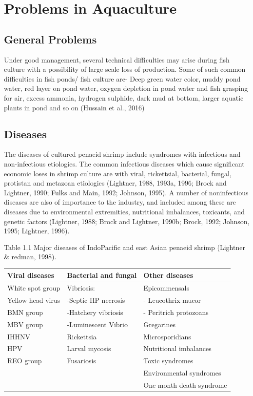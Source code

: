 \documentclass[
]{book}
\begin{document}
\hypertarget{problems-in-aquaculture}{%
\section{Problems in Aquaculture}\label{problems-in-aquaculture}}

\hypertarget{general-problems}{%
\subsection{General Problems}\label{general-problems}}

Under good management, several technical difficulties may arise during
fish culture with a possibility of large scale loss of production. Some
of such common difficulties in fish ponds/ fish culture are- Deep green
water color, muddy pond water, red layer on pond water, oxygen depletion
in pond water and fish grasping for air, excess ammonia, hydrogen
sulphide, dark mud at bottom, larger aquatic plants in pond and so on
(Hussain et al., 2016)

\hypertarget{diseases}{%
\subsection{Diseases}\label{diseases}}

The diseases of cultured penaeid shrimp include syndromes with
infectious and non-infectious etiologies. The common infectious diseases
which cause significant economic loses in shrimp culture are with viral,
rickettsial, bacterial, fungal, protistan and metazoan etiologies
(Lightner, 1988, 1993a, 1996; Brock and Lightner, 1990; Fulks and Main,
1992; Johnson, 1995). A number of noninfectious diseases are also of
importance to the industry, and included among these are diseases due to
environmental extremities, nutritional imbalances, toxicants, and
genetic factors (Lightner, 1988; Brock and Lightner, 1990b; Brock, 1992;
Johnson, 1995; Lightner, 1996).

Table 1.1 Major diseases of IndoPacific and east Asian penaeid shrimp
(Lightner \& redman, 1998).

\begin{longtable}[]{@{}lll@{}}
\toprule()
Viral diseases & Bacterial and fungal & Other diseases \\
\midrule()
\endhead
White spot group & Vibriosis: & Epicommensals \\
Yellow head virus & -Septic HP necrosis & - Leucothrix mucor \\
BMN group & -Hatchery vibriosis & - Peritrich protozoans \\
MBV group & -Luminescent Vibrio & Gregarines \\
IHHNV & Rickettsia & Microsporidians \\
HPV & Larval mycosis & Nutritional imbalances \\
REO group & Fusariosis & Toxic syndromes \\
& & Environmental syndromes \\
& & One month death syndrome \\
\bottomrule()
\end{longtable}
\end{document}
